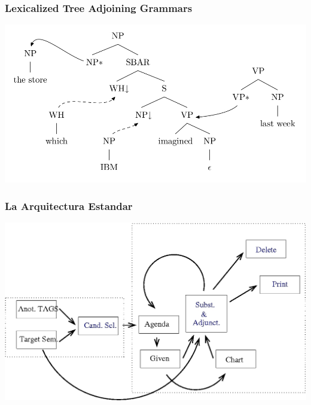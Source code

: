 \documentclass[compress,color=usenames]{beamer}
\begin{document}
\begin{frame}
\frametitle{Lexicalized Tree Adjoining Grammars}

\begin{center}
\includegraphics[scale=.4]{pics/pic2-8.jpg}
\end{center}

\end{frame}

\begin{frame}
\frametitle{La Arquitectura Estandar}

\begin{center}
\includegraphics[scale=.32]{pics/gen.jpg}
\end{center}
\end{frame}
\end{document}
